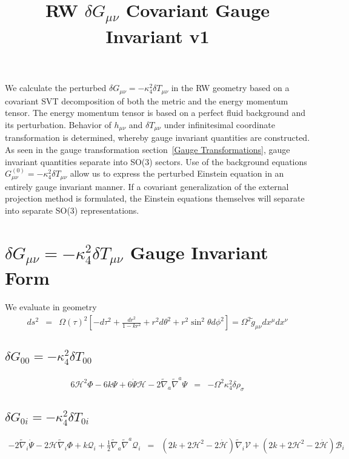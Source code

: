 \documentclass[10pt,letterpaper]{article}
\title{RW $\delta G_{\mu\nu}$ Covariant Gauge Invariant v1}
\date{}
\numberwithin{equation}{section}
\begin{document}
 
\maketitle
\tableofcontents
\newpage
\noindent 
\abstract
We calculate the perturbed $\delta G_{\mu\nu} = -\kappa^2_4 \delta T_{\mu\nu}$ in the RW geometry based on a covariant SVT decomposition of both the metric and the energy momentum tensor. The energy momentum tensor is based on a perfect fluid background and its perturbation. Behavior of $h_{\mu\nu}$ and $\delta T_{\mu\nu}$ under infinitesimal coordinate transformation is determined, whereby gauge invariant quantities are constructed. As seen in the gauge transformation section~\ref{Gauge Transformations}, gauge invariant quantities separate into SO(3) sectors. Use of the background equations $G_{\mu\nu}^{(0)} = -\kappa^2_4\delta T_{\mu\nu}$ allow us to express the perturbed Einstein equation in an entirely gauge invariant manner. If a covariant generalization of the external projection method is formulated, the Einstein equations themselves will separate into separate SO(3) representations. 
\section{$\delta G_{\mu\nu} = -\kappa^2_4 \delta T_{\mu\nu}$ Gauge Invariant Form}
We evaluate in geometry
\begin{eqnarray}
ds^2 &=& \Omega(\tau)^2 \left[ -d\tau^2 + \frac{dr^2}{1-kr^2} + r^2d\theta^2 + r^2\sin^2\theta d\phi^2\right]= \Omega^2 \tilde g_{\mu\nu} dx^\mu dx^\nu
\end{eqnarray}

\subsection*{$\delta G_{00} = -\kappa^2_4 \delta T_{00}$}
\begin{eqnarray}
 6\mathcal H^2 \Phi- 6 k \Psi + 6 \dot{\Psi} \mathcal H - 2 \tilde\nabla_{a}\tilde\nabla^{a}\Psi&=& -\Omega^2 \kappa^2_4 \delta \rho_\sigma
\end{eqnarray}

\subsection*{$\delta G_{0i} = -\kappa^2_4 \delta T_{0i}$}
\begin{eqnarray}
- 2 \tilde\nabla_{i}\dot{\Psi}
 - 2 \mathcal H \tilde\nabla_{i}\Phi + k \mathcal Q_i + \tfrac{1}{2} \tilde\nabla_{a}\tilde\nabla^{a}\mathcal Q_{i}
&=& 
(2k+2\mathcal H^2 - 2\dot{\mathcal H}) \tilde\nabla_i\mathcal V +  (2k +2\mathcal H^2 - 2\dot{\mathcal H}) \mathcal B_{i}
\end{eqnarray}
\end{document}
